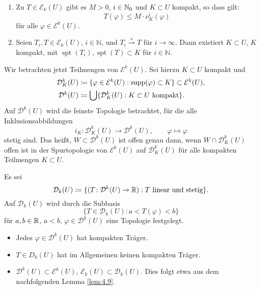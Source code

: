 \documentclass[a4paper,twoside,DIV15,BCOR12mm]{scrbook}
\DeclareMathOperator{\spt}{spt}
\begin{document}
\begin{lemma}
\label{lem:4.7}
\begin{enumerate}[\quad(a)]
\item Zu $T\in \mathcal E_k(U)$ gibt es $M>0$, $i\in\mathbb{N}_0$ und $K\subset U$ kompakt, so dass gilt:
\[
T(\varphi) \le M \cdot \nu_K^i (\varphi)
\]
für alle $\varphi\in\mathcal E^k(U)$.
\item Seien $T_i, T \in\mathcal E_k(U)$, $i\in\mathbb{N}$, und $T_i \stackrel{s}{\rightharpoonup} T$ für $i\to\infty$. Dann existiert $K\subset U$, $K$ kompakt, mit $\spt(T_i), \spt(T) \subset K$ für $i\in\mathbb{N}$.
\end{enumerate}
\end{lemma}

Wir betrachten jetzt Teilmengen von $\mathcal E^k(U)$. Sei hierzu $K\subset U$ kompakt und
\begin{align*}
\mathcal D_K^k(U) &\da \{\varphi\in\mathcal E^k(U): \supp(\varphi) \subset K\} \subset \mathcal E^k(U), \\
\mathcal D^k(U) &\da \bigcup \{\mathcal D_K^k(U) : K\subset U \text{ kompakt}\}.
\end{align*}
Auf $\mathcal D^k(U)$ wird die feinste Topologie betrachtet, für die alle Inklusionsabbildungen 
$$
i_K\colon \mathcal D_K^k(U) \to \mathcal D^k(U),\qquad \varphi\mapsto\varphi
$$ 
stetig sind. Das heißt, $W\subset \mathcal D^k(U)$ ist offen genau dann, 
wenn $W\cap \mathcal D_K^k(U)$ offen ist in der Spurtopologie von $\mathcal E^k(U)$ auf $\mathcal D_K^k(U)$ 
für alle kompakten Teilmengen $K\subset U$.

\begin{definition}
Es sei
\[
\mathcal D_k(U) \da \{ (T\colon \mathcal D^k(U) \to \MdR) : \text{$T$ linear und stetig}\}.
\]
Auf $\mathcal D_k(U)$ wird durch die Subbasis
\[
\{T\in \mathcal D_k(U) : a < T(\varphi) < b\}
\]
für $a,b\in\mathbb{R}$, $a<b$, $\varphi\in\mathcal D^k(U)$ eine Topologie festgelegt.
\end{definition}

\begin{bemerkungenX}
\begin{itemize}
\item Jedes $\varphi\in \mathcal D^k(U)$ hat kompakten Träger.
\item $T\in D_k(U)$ hat im Allgemeinen keinen kompakten Träger.
\item $\mathcal D^k(U) \subset \mathcal E^k(U)$, $\mathcal E_k(U) \subset \mathcal D_k(U)$. Dies folgt etwa aus 
dem nachfolgenden Lemma \ref{lem:4.9}.
\end{itemize}
\end{bemerkungenX}
\end{document}
